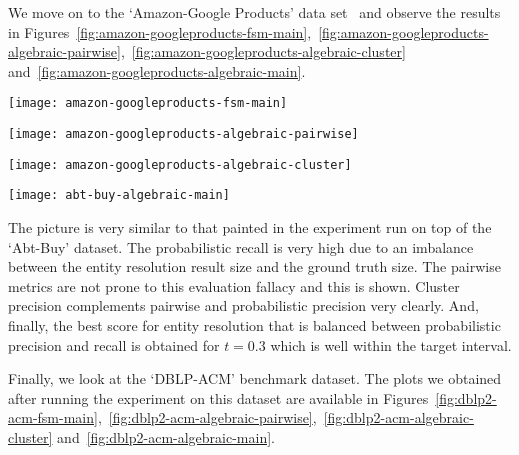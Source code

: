We move on to the `Amazon-Google Products' data set~\cite{vldb2010} and observe
the results in Figures~\ref{fig:amazon-googleproducts-fsm-main},~\ref{fig:amazon-googleproducts-algebraic-pairwise},~\ref{fig:amazon-googleproducts-algebraic-cluster} and~\ref{fig:amazon-googleproducts-algebraic-main}.

\begin{figure*}[htbp]
    \begin{minipage}{0.24\textwidth}
        \centering
        \texttt{[image: amazon-googleproducts-fsm-main]}
        \caption{Amazon-Google statistical metrics.}\label{fig:amazon-googleproducts-fsm-main}
    \end{minipage}
    \begin{minipage}{0.24\textwidth}
        \centering
        \texttt{[image: amazon-googleproducts-algebraic-pairwise]}
        \caption{Amazon-Google pairwise metrics.}\label{fig:amazon-googleproducts-algebraic-pairwise}
    \end{minipage}
    \begin{minipage}{0.24\textwidth}
        \centering
        \texttt{[image: amazon-googleproducts-algebraic-cluster]}
        \caption{Amazon-Google cluster metrics.}\label{fig:amazon-googleproducts-algebraic-cluster}
    \end{minipage}
    \begin{minipage}{0.24\textwidth}
        \centering
        \texttt{[image: abt-buy-algebraic-main]}
        \caption{Amazon-Google clustering indexes.}\label{fig:amazon-googleproducts-algebraic-main}
    \end{minipage}
\end{figure*}\label{amazon-google}

The picture is very similar to that painted in the experiment run on top of the
`Abt-Buy' dataset.
The probabilistic recall is very high due to an imbalance between the entity
resolution result size and the ground truth size.
The pairwise metrics are not prone to this evaluation fallacy and this is shown.
Cluster precision complements pairwise and probabilistic precision very clearly.
And, finally, the best score for entity resolution that is balanced between
probabilistic precision and recall is obtained for $t=0.3$ which is well within
the target interval.

Finally, we look at the `DBLP-ACM' benchmark dataset.
The plots we obtained after running the experiment on this dataset are available
in Figures~\ref{fig:dblp2-acm-fsm-main},~\ref{fig:dblp2-acm-algebraic-pairwise},~\ref{fig:dblp2-acm-algebraic-cluster} and~\ref{fig:dblp2-acm-algebraic-main}.

